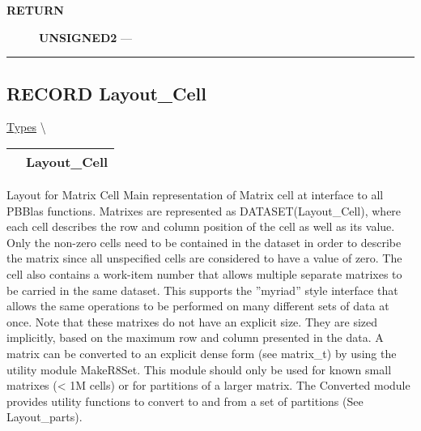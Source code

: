 \par
\begin{description}
\item [\colorbox{tagtype}{\color{white} \textbf{\textsf{RETURN}}}] \textbf{UNSIGNED2} --- 
\end{description}




\rule{\linewidth}{0.5pt}
\subsection*{\textsf{\colorbox{headtoc}{\color{white} RECORD}
Layout\_Cell}}

\hypertarget{ecldoc:pbblas.types.layout_cell}{}
\hspace{0pt} \hyperlink{ecldoc:PBblas.Types}{Types} \textbackslash 

{\renewcommand{\arraystretch}{1.5}
\begin{tabularx}{\textwidth}{|>{\raggedright\arraybackslash}l|X|}
\hline
\hspace{0pt}\mytexttt{\color{red} } & \textbf{Layout\_Cell} \\
\hline
\end{tabularx}
}

\par





Layout for Matrix Cell Main representation of Matrix cell at interface to all PBBlas functions. Matrixes are represented as DATASET(Layout\_Cell), where each cell describes the row and column position of the cell as well as its value. Only the non-zero cells need to be contained in the dataset in order to describe the matrix since all unspecified cells are considered to have a value of zero. The cell also contains a work-item number that allows multiple separate matrixes to be carried in the same dataset. This supports the ''myriad'' style interface that allows the same operations to be performed on many different sets of data at once. Note that these matrixes do not have an explicit size. They are sized implicitly, based on the maximum row and column presented in the data. A matrix can be converted to an explicit dense form (see matrix\_t) by using the utility module MakeR8Set. This module should only be used for known small matrixes (< 1M cells) or for partitions of a larger matrix. The Converted module provides utility functions to convert to and from a set of partitions (See Layout\_parts).







